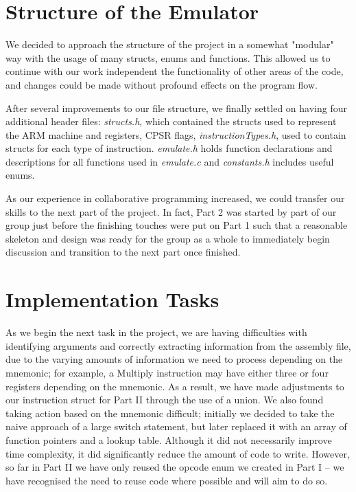 \documentclass[10pt]{article}
\begin{document}
\section{Structure of the Emulator}
We decided to approach the structure of the project in a somewhat "modular" way with the usage of many structs, enums and functions. This allowed us to continue with our work independent the functionality of other areas of the code, and changes could be made without profound effects on the program flow.

After several improvements to our file structure, we finally settled on having four additional header files: \textit{structs.h}, which contained the structs used to represent the ARM machine and registers, CPSR flags, \textit{instructionTypes.h}, used to contain structs for each type of instruction.
\textit{emulate.h} holds function declarations and descriptions for all functions used in \textit{emulate.c} and \textit{constants.h} includes useful enums.

As our experience in collaborative programming increased, we could transfer our skills to the next part of the project. In fact, Part 2 was started by part of our group just before the finishing touches were put on Part 1 such that a reasonable skeleton and design was ready for the group as a whole to immediately begin discussion and transition to the next part once finished.


\section{Implementation Tasks}
As we begin the next task in the project, we are having difficulties with identifying arguments and correctly extracting information from the assembly file, due to the varying amounts of information we need to process depending on the mnemonic; for example, a Multiply instruction may have either three or four registers depending on the mnemonic. As a result, we have made adjustments to our instruction struct for Part II through the use of a union.
We also found taking action based on the mnemonic difficult; initially we decided to take the naive approach of a large switch statement, but later replaced it with an array of function pointers and a lookup table. Although it did not necessarily improve time complexity, it did significantly reduce the amount of code to write.
However, so far in Part II we have only reused the opcode enum we created in Part I -- we have recognised the need to reuse code where possible and will aim to do so.
\end{document}
